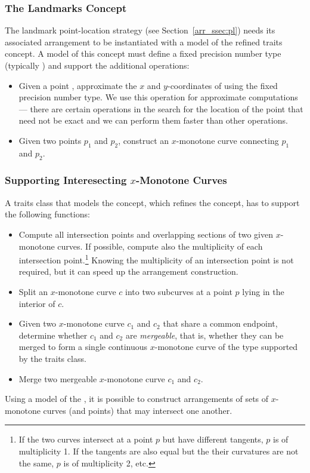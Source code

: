 \subsubsection{The Landmarks Concept
\label{arr_sssec:tr_lanmarks_concept}}

The landmark point-location strategy (see
Section~\ref{arr_ssec:pl}) needs its associated arrangement to be
instantiated with a model of the refined
 traits concept. A model of this
concept must define a fixed precision number type (typically
) and support the additional operations:
\begin{itemize}
\item Given a point , approximate the $x$ and $y$-coordinates
of  using the fixed precision number type. We use this operation
for approximate computations --- there are certain operations in the
search for the location of the point that need not be exact and we can
perform them faster than other operations.
%
\item Given two points $p_1$ and $p_2$, construct an $x$-monotone
curve connecting $p_1$ and $p_2$.
\end{itemize}

\subsubsection{Supporting Interesecting $x$-Monotone Curves
\label{arr_sssec:tr_xmon_concept}}

A traits class that models the 
concept, which refines the 
concept, has to support the following functions:
\begin{itemize}
\item Compute all intersection points and overlapping sections of
two given $x$-monotone curves. If possible, compute also the
multiplicity of each intersection point.\footnote{If the two
curves intersect at a point $p$ but have different tangents, $p$
is of multiplicity 1. If the tangents are also equal but the their
curvatures are not the same, $p$ is of multiplicity 2, etc.}
Knowing the multiplicity of an intersection point is not required,
but it can speed up the arrangement construction.
%
\item Split an $x$-monotone curve $c$ into two subcurves at a point
$p$ lying in the interior of $c$.
%
\item Given two $x$-monotone curve $c_1$ and $c_2$ that share a
common endpoint, determine whether $c_1$ and $c_2$ are {\em
mergeable}, that is, whether they can be merged to form a
single continuous $x$-monotone curve of the type supported by the
traits class.
%
\item Merge two mergeable $x$-monotone curve $c_1$ and $c_2$.
\end{itemize}
Using a model of the , it is
possible to construct arrangements of sets of $x$-monotone curves
(and points) that may intersect one another.

